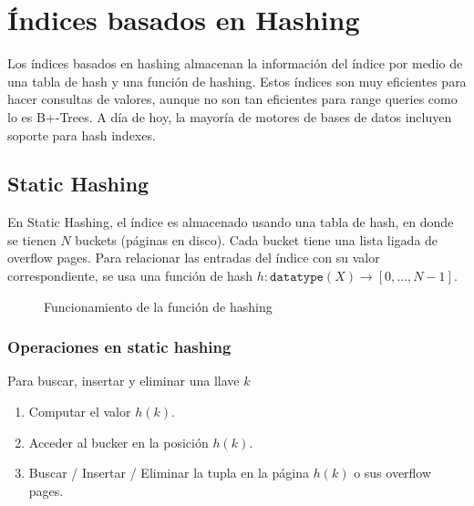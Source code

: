 \section{Índices basados en Hashing}
Los índices basados en hashing almacenan la información del índice por medio de una tabla de hash y una función de hashing. Estos índices son muy eficientes para hacer consultas de valores, aunque no son tan eficientes para range queries como lo es B+-Trees. A día de hoy, la mayoría de motores de bases de datos incluyen soporte para hash indexes.

\subsection{Static Hashing}
En Static Hashing, el índice es almacenado usando una tabla de hash, en donde se tienen $N$ buckets (páginas en disco). Cada bucket tiene una lista ligada de overflow pages. Para relacionar las entradas del índice con su valor correspondiente, se usa una función de hash $h: \texttt{datatype}(X) \rightarrow [0, \ldots, N-1]$.

\begin{figure}[h]
  \centering
  \caption{Funcionamiento de la función de hashing}
\end{figure}

\subsubsection{Operaciones en static hashing}
Para buscar, insertar y eliminar una llave $k$
\begin{enumerate}
  \item Computar el valor $h(k)$.
  \item Acceder al bucker en la posición $h(k)$.
  \item Buscar / Insertar / Eliminar la tupla en la página $h(k)$ o sus overflow pages.
\end{enumerate}


